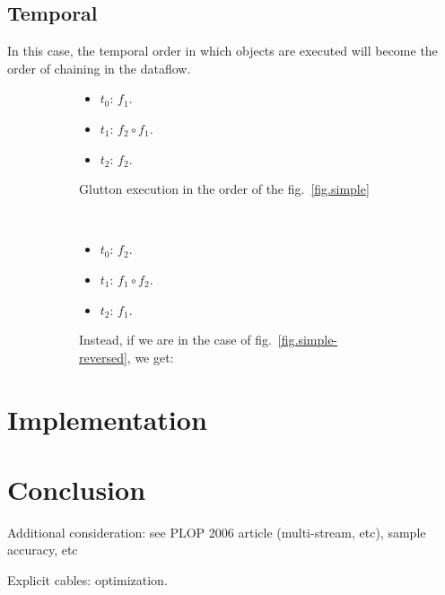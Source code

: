\documentclass{article}
\begin{document}
    \subsection{Temporal}
    In this case, the temporal order in which objects are executed
    will become the order of chaining in the dataflow.
    
    
    
    \begin{figure}
    	\begin{subfigure}{0.15\textwidth }
    		
    		\begin{itemize}
    			\item $t_0$: $f_1$.
    			\item $t_1$: $f_2 \circ f_1$.
    			\item $t_2$: $f_2$. 
    		\end{itemize}
    		\caption{Glutton execution in the order of the fig.~\ref{fig.simple}}
    	\end{subfigure}~
    \begin{subfigure}{0.15\textwidth}
    	
    	\begin{itemize}
    		\item $t_0$: $f_2$.
    		\item $t_1$: $f_1 \circ f_2$.
    		\item $t_2$: $f_1$. 
    	\end{itemize}
    	\caption{
    		Instead, if we are in the case of fig.~\ref{fig.simple-reversed}, we get: }
    \end{subfigure}
    \caption{}
    \end{figure}
    
    
    
	\section{Implementation}
    \section{Conclusion}
    Additional consideration: see PLOP 2006 article (multi-stream, etc), sample accuracy, etc
    
    Explicit cables: optimization.
\end{document}
